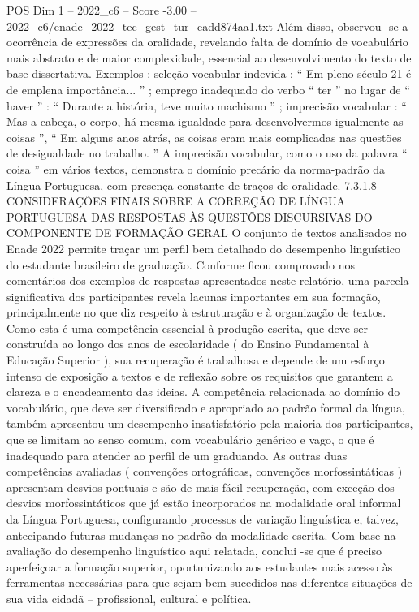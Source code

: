 \begin{textsample}{POS Dim 1 – 2022\_c6 – Score -3.00 – 2022\_c6/enade\_2022\_tec\_gest\_tur\_eadd874aa1.txt}
Além disso, observou -se a ocorrência de expressões da oralidade, revelando falta de domínio de vocabulário mais abstrato e de maior complexidade, essencial ao desenvolvimento do texto de base dissertativa.
Exemplos : seleção vocabular indevida : “ Em pleno século 21 é de emplena importância... ” ; emprego inadequado do verbo “ ter ” no lugar de “ haver ” : “ Durante a história, teve muito machismo ” ; imprecisão vocabular : “ Mas a cabeça, o corpo, há mesma igualdade para desenvolvermos igualmente as coisas ”, “ Em alguns anos atrás, as coisas eram mais complicadas nas questões de desigualdade no trabalho. ” A imprecisão vocabular, como o uso da palavra “ coisa ” em vários textos, demonstra o domínio precário da norma-padrão da Língua Portuguesa, com presença constante de traços de oralidade. 7.3.1.8 CONSIDERAÇÕES FINAIS SOBRE A CORREÇÃO DE LÍNGUA PORTUGUESA DAS RESPOSTAS ÀS QUESTÕES DISCURSIVAS DO COMPONENTE DE FORMAÇÃO GERAL O conjunto de textos analisados no Enade 2022 permite traçar um perfil bem detalhado do desempenho linguístico do estudante brasileiro de graduação.
Conforme ficou comprovado nos comentários dos exemplos de respostas apresentados neste relatório, uma parcela significativa dos participantes revela lacunas importantes em sua formação, principalmente no que diz respeito à estruturação e à organização de textos.
Como esta é uma competência essencial à produção escrita, que deve ser construída ao longo dos anos de escolaridade ( do Ensino Fundamental à Educação Superior ), sua recuperação é trabalhosa e depende de um esforço intenso de exposição a textos e de reflexão sobre os requisitos que garantem a clareza e o encadeamento das ideias.
A competência relacionada ao domínio do vocabulário, que deve ser diversificado e apropriado ao padrão formal da língua, também apresentou um desempenho insatisfatório pela maioria dos participantes, que se limitam ao senso comum, com vocabulário genérico e vago, o que é inadequado para atender ao perfil de um graduando.
As outras duas competências avaliadas ( convenções ortográficas, convenções morfossintáticas ) apresentam desvios pontuais e são de mais fácil recuperação, com exceção dos desvios morfossintáticos que já estão incorporados na modalidade oral informal da Língua Portuguesa, configurando processos de variação linguística e, talvez, antecipando futuras mudanças no padrão da modalidade escrita.
Com base na avaliação do desempenho linguístico aqui relatada, conclui -se que é preciso aperfeiçoar a formação superior, oportunizando aos estudantes mais acesso às ferramentas necessárias para que sejam bem-sucedidos nas diferentes situações de sua vida cidadã – profissional, cultural e política.

\end{textsample}
